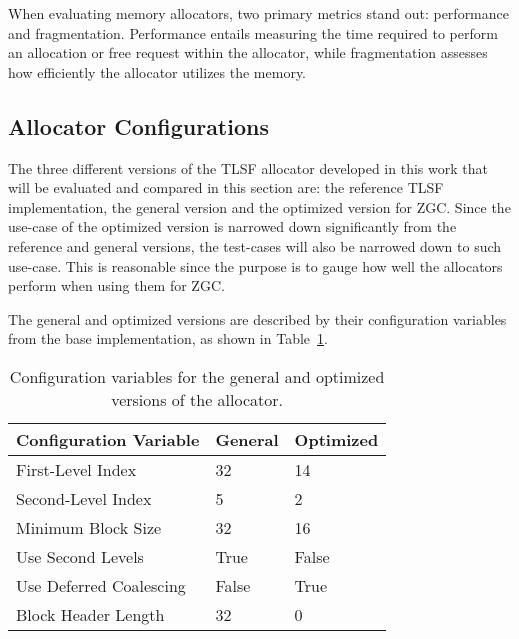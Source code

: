 
When evaluating memory allocators, two primary metrics stand out: performance and fragmentation. Performance entails measuring the time required to perform an allocation or free request within the allocator, while fragmentation assesses how efficiently the allocator utilizes the memory.

\subsection{Allocator Configurations}



The three different versions of the TLSF allocator developed in this work that will be evaluated and compared in this section are: the reference TLSF implementation, the general version and the optimized version for ZGC. Since the use-case of the optimized version is narrowed down significantly from the reference and general versions, the test-cases will also be narrowed down to such use-case. This is reasonable since the purpose is to gauge how well the allocators perform when using them for ZGC.

The general and optimized versions are described by their configuration variables from the base implementation, as shown in Table~\ref{table:configuration-variables}.

\begin{table}[H]
\centering
\begin{tabular}{lllll}
\hline
Configuration Variable  & General  & \multicolumn{3}{l}{Optimized} \\ \hline
First-Level Index       & 32       & \multicolumn{3}{l}{14}        \\
Second-Level Index      & 5        & \multicolumn{3}{l}{2}         \\
Minimum Block Size      & 32       & \multicolumn{3}{l}{16 }       \\
Use Second Levels       & True     & \multicolumn{3}{l}{False}     \\
Use Deferred Coalescing & False    & \multicolumn{3}{l}{True}      \\
Block Header Length     & 32       & \multicolumn{3}{l}{0}        
\end{tabular}
\caption{Configuration variables for the general and optimized versions of the allocator.}
\label{table:configuration-variables}
\end{table}

